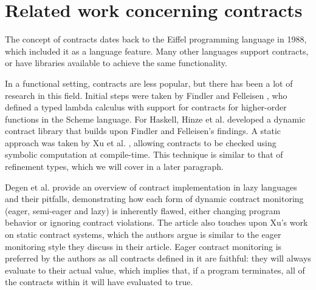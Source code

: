 \documentclass[10pt]{report}
\newcommand{\CW}{$\mathcal{CW}$}
\begin{document}
%
%

\section{Related work concerning contracts}
\label{section:relatedworkcontracts}
The concept of contracts dates back to the Eiffel programming language \cite{Meyer:1988wp} in 1988, which included it as a language feature.
Many other languages support contracts, or have libraries available to achieve the same functionality.

In a functional setting, contracts are less popular, but there has been a lot of research in this field.
Initial steps were taken by Findler and Felleisen \cite{Findler:2002:CHF:583852.581484}, who defined a typed lambda calculus with support for contracts for higher-order functions in the Scheme language.
For Haskell, Hinze et al. \cite{Hinze06typedcontracts} developed a dynamic contract library that builds upon Findler and Felleisen's findings. 
A static approach was taken by Xu et al. \cite{Xu:2006ul, Xu:2009:SCC:1594834.1480889}, allowing contracts to be checked using symbolic computation at compile-time. This technique is similar to that of refinement types, which we will cover in a later paragraph.

Degen et al. \cite{DegenThiemannWehr2009} provide an overview of contract implementation in lazy languages and their pitfalls, demonstrating how each form of dynamic contract monitoring (eager, semi-eager and lazy) is inherently flawed, either changing program behavior or ignoring contract violations.
The article also touches upon Xu's work on static contract systems, which the authors argue is similar to the eager monitoring style they discuss in their article.
Eager contract monitoring is preferred by the authors as all contracts defined in it are faithful: they will always evaluate to their actual value, which implies that, if a program terminates, all of the contracts within it will have evaluated to true.
\end{document}
